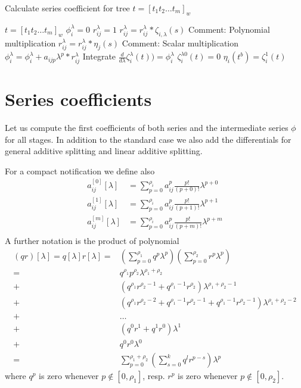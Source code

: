 \documentclass[english,unicode]{article}
\begin{document}
\begin{algorithm}
\caption{Calculate series coefficient for tree $t=[t_1t_2\ldots t_m]_w$}
\begin{algorithmic}
\STATE $t=[t_1t_2\ldots t_m]_w$
\STATE $\phi_i^\lambda=0$
\STATE  $r_{ij}^\lambda=1$
\STATE $r_{ij}^\lambda=r_{ij}^\lambda*\zeta_{i,\lambda}(s)$ Comment: Polynomial multiplication
\ELSE
\STATE $r_{ij}^\lambda=r_{ij}^\lambda*\eta_j(s)$ Comment: Scalar multiplication
\ENDIF
\ENDFOR
{}
\STATE $\phi_i^\lambda=\phi_i^\lambda+a_{ijp}\lambda^p*r_{ij}^\lambda$
\ENDFOR
\ENDFOR
\STATE Integrate $\frac{d}{d\lambda}\zeta_i^\lambda(t))=\phi_i^\lambda $
\STATE $\zeta^{\lambda 0}_i(t)=0$
\STATE $\eta_i(t^b)=\zeta^{1}_{i}(t)$ 
\ENDFOR
\end{algorithmic}
\end{algorithm}

\section{Series coefficients}
Let us compute the first coefficients of both series and the intermediate series $\phi$ for all stages. 
In addition to the standard case we also add the differentials for general additive splitting and linear additive splitting.

For a compact notification we define also
\begin{align*}
a_{ij}^{[0]}[\lambda] & = \sum_{p=0}^{\rho_i}a_{ij}^p\frac{p!}{(p+0)!}\lambda^{p+0}\\
a_{ij}^{[1]}[\lambda] & = \sum_{p=0}^{\rho_i}a_{ij}^p\frac{p!}{(p+1)!}\lambda^{p+1}\\
a_{ij}^{[m]}[\lambda] & = \sum_{p=0}^{\rho_i}a_{ij}^p\frac{p!}{(p+m)!}\lambda^{p+m}\\
\end{align*}
A further notation is the product of polynomial
\begin{align*}
(qr)[\lambda]=q[\lambda]  r[\lambda] = &(\sum_{p=0}^{\rho_1} q^p \lambda^p)(\sum_{p=0}^{\rho_2} r^p \lambda^p)\\
  = &  q^{\rho_1}p^{\rho_2}\lambda^{\rho_1+\rho_2}\\
 + & (q^{\rho_1}r^{\rho_2-1}+q^{\rho_1-1}r^{\rho_2})\lambda^{\rho_1+\rho_2-1}\\
  + & (q^{\rho_1}r^{\rho_2-2}+q^{\rho_1-1}r^{\rho_2-1}+q^{\rho_1-1}r^{\rho_2-1})\lambda^{\rho_1+\rho_2-2}\\
  + &\ldots \\
   + & (q^{0}r^{1}+q^{1}r^{0})\lambda^1\\
  + & q^{0}r^{0}\lambda^0\\
 = & \sum_{p=0}^{\rho_1+\rho_2}(\sum_{s=0}^{k} q^{l}r^{p-s})\lambda^{p}
\end{align*}
where $q^p$ is zero whenever  $p\not\in [0,\rho_1]$, resp. $r^p$ is zero whenever  $p\not\in [0,\rho_2]$.
\end{document}
